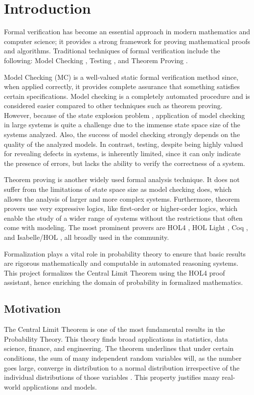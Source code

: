 \chapter{Introduction}
\label{intro}

Formal verification has become an essential approach in modern mathematics and computer science; it provides a strong framework for proving mathematical proofs and algorithms. Traditional techniques of formal verification include the following: Model Checking \cite{clarke2018handbook}, Testing \cite{broy2005model}, and Theorem Proving \cite{bertot2013interactive}.

Model Checking (MC) is a well-valued static formal verification method since, when applied correctly, it provides complete assurance that something satisfies certain specifications. Model checking is a completely automated procedure and is considered easier compared to other techniques such as theorem proving. However, because of the state explosion problem \cite{burch1992symbolic}, application of model checking in large systems is quite a challenge due to the immense state space size of the systems analyzed. Also, the success of model checking strongly depends on the quality of the analyzed models. In contrast, testing, despite being highly valued for revealing defects in systems, is inherently limited, since it can only indicate the presence of errors, but lacks the ability to verify the correctness of a system.

Theorem proving is another widely used formal analysis technique. It does not suffer from the limitations of state space size as model checking does, which allows the analysis of larger and more complex systems. Furthermore, theorem provers use very expressive logics, like first-order or higher-order logics, which enable the study of a wider range of systems without the restrictions that often come with modeling. The most prominent provers are HOL4 \cite{slind2008brief}, HOL Light \cite{hollight}, Coq \cite{bertot2013interactive}, and Isabelle/HOL \cite{isabelle}, all broadly used in the community.

Formalization plays a vital role in probability theory to ensure that basic results are rigorous mathematically and computable in automated reasoning systems. This project formalizes the Central Limit Theorem using the HOL4 proof assistant, hence enriching the domain of probability in formalized mathematics.

\section{Motivation}
The Central Limit Theorem is one of the most fundamental results in the Probability Theory. This theory finds broad applications in statistics, data science, finance, and engineering. The theorem underlines that under certain conditions, the sum of many independent random variables will, as the number goes large, converge in distribution to a normal distribution irrespective of the individual distributions of those variables \cite{chung2000course}. This property justifies many real-world applications and models.

